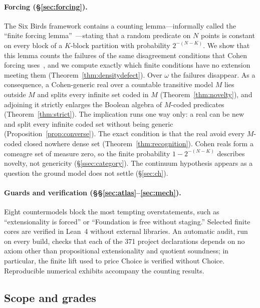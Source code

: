 \documentclass[11pt]{article}
\theoremstyle{definition}
\begin{document}
\paragraph{Forcing (\S\ref{sec:forcing}).} The Six Birds framework contains a counting
lemma---informally called the ``finite forcing lemma''~\citep{SBTFoundationsI}---stating that a
random predicate on $N$ points is constant on every block of a $K$-block partition with
probability $2^{-(N-K)}$. We show that this lemma counts the failures of the same disagreement
conditions that Cohen forcing uses~\citep{Cohen1963, Cohen1966}, and we compute exactly which
finite conditions have no extension meeting them (Theorem~\ref{thm:densitydefect}). Over
$\omega$ the failures disappear. As a consequence, a Cohen-generic real over a countable
transitive model $M$ lies outside $M$ and splits every infinite set coded in $M$
(Theorem~\ref{thm:novelty}), and adjoining it strictly enlarges the Boolean algebra of
$M$-coded predicates (Theorem~\ref{thm:strict}). The implication runs one way only: a real can
be new and split every infinite coded set without being generic
(Proposition~\ref{prop:converse}). The exact condition is that the real avoid every $M$-coded
closed nowhere dense set (Theorem~\ref{thm:recognition}). Cohen reals form a comeagre set of
measure zero, so the finite probability $1-2^{-(N-K)}$ describes novelty, not genericity
(\S\ref{ssec:category}). The continuum hypothesis appears as a question the ground model does
not settle (\S\ref{sec:ch}).

\paragraph{Guards and verification (\S\S\ref{sec:atlas}--\ref{sec:mech}).} Eight countermodels
block the most tempting overstatements, such as ``extensionality is forced'' or ``Foundation is
free without staging.'' Selected finite cores are verified in Lean~4 without external libraries.
An automatic audit, run on every build, checks that each of the 371 project declarations depends
on no axiom other than propositional extensionality and quotient soundness; in particular, the
finite lift used to price Choice is verified without Choice. Reproducible numerical exhibits
accompany the counting results.

\subsection{Scope and grades}
\end{document}
